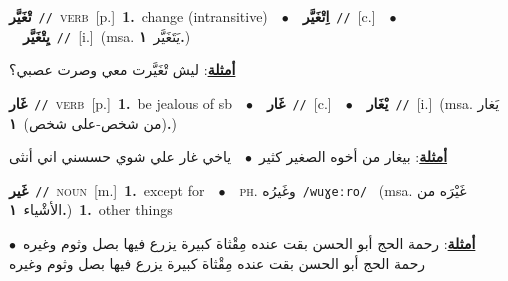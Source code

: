 \documentclass[10pt,a4paper,twoside]{article} %
\begin{document}
\begin{multicols}{2}
{\setlength\topsep{0pt}\textbf{\foreignlanguage{arabic}{تْغَيَّر}}\ {\color{gray}\texttt{//}\color{black}}\ \textsc{verb}\ [p.]\ \textbf{1.}~change (intransitive)\ \ $\bullet$\ \ \setlength\topsep{0pt}\textbf{\foreignlanguage{arabic}{اِتْغَيَّر}}\ {\color{gray}\texttt{//}\color{black}}\ [c.]\ \ $\bullet$\ \ \setlength\topsep{0pt}\textbf{\foreignlanguage{arabic}{يِتْغَيَّر}}\ {\color{gray}\texttt{//}\color{black}}\ [i.]\ \color{gray}(msa. \foreignlanguage{arabic}{يَتَغَيَّر}~\foreignlanguage{arabic}{\textbf{١.}})\color{black}\  \begin{flushright}\color{gray}\foreignlanguage{arabic}{\textbf{\underline{\foreignlanguage{arabic}{أمثلة}}}: ليش تْغَيَّرت معي وصرت عصبي؟}\end{flushright}\color{black}} \vspace{2mm}

{\setlength\topsep{0pt}\textbf{\foreignlanguage{arabic}{غَار}}\ {\color{gray}\texttt{//}\color{black}}\ \textsc{verb}\ [p.]\ \textbf{1.}~be jealous of sb\ \ $\bullet$\ \ \setlength\topsep{0pt}\textbf{\foreignlanguage{arabic}{غَار}}\ {\color{gray}\texttt{//}\color{black}}\ [c.]\ \ $\bullet$\ \ \setlength\topsep{0pt}\textbf{\foreignlanguage{arabic}{يْغَار}}\ {\color{gray}\texttt{//}\color{black}}\ [i.]\ \color{gray}(msa. \foreignlanguage{arabic}{يَغار (من شخص-على شخص)}~\foreignlanguage{arabic}{\textbf{١.}})\color{black}\  \begin{flushright}\color{gray}\foreignlanguage{arabic}{\textbf{\underline{\foreignlanguage{arabic}{أمثلة}}}: بيغار من أخوه الصغير كثير\ $\bullet$\ \  ياخي غار علي شوي حسسني اني أنثى}\end{flushright}\color{black}} \vspace{2mm}

{\setlength\topsep{0pt}\textbf{\foreignlanguage{arabic}{غَير}}\ {\color{gray}\texttt{//}\color{black}}\ \textsc{noun}\ [m.]\ \textbf{1.}~except for\ \ $\bullet$\ \ \textsc{ph.} \color{gray} \foreignlanguage{arabic}{وغَيرُه}\color{black}\ {\color{gray}\texttt{/{\sffamily wuɣeːro}/}\color{black}}\ \color{gray} (msa. \foreignlanguage{arabic}{غَيْرَه من الأشْياء}~\foreignlanguage{arabic}{\textbf{١.}})\color{black}\ \textbf{1.}~other things\  \begin{flushright}\color{gray}\foreignlanguage{arabic}{\textbf{\underline{\foreignlanguage{arabic}{أمثلة}}}: رحمة الحج أبو الحسن بقت عنده مِقْثاة كبيرة يزرع فيها بصل وثوم وغيره\ $\bullet$\ \  رحمة الحج أبو الحسن بقت عنده مِقْثاة كبيرة يزرع فيها بصل وثوم وغيره}\end{flushright}\color{black}} \vspace{2mm}


\end{multicols}
\end{document}
